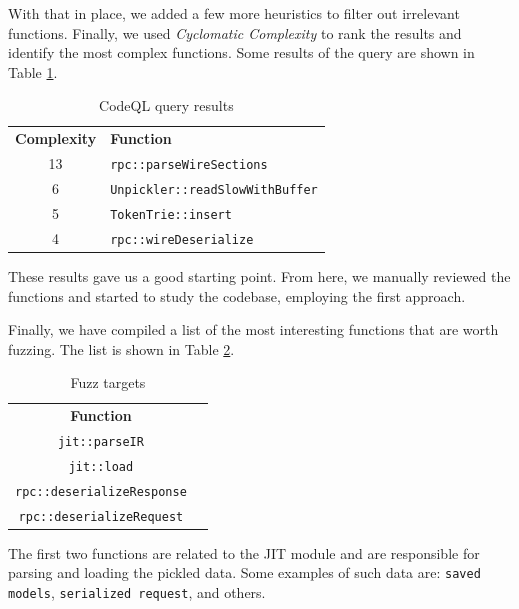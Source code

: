 With that in place, we added a few more heuristics to filter out irrelevant functions. Finally, we used \textit{Cyclomatic Complexity} \cite{cyclomatic-complexity-density} to rank the results and identify the most complex functions. Some results of the query are shown in Table \ref{table:codeql-results}.

\begin{table}[h]
    \centering
    \begin{tabular}{cl}
        \toprule
        \textbf{Complexity} & \textbf{Function}                      \\
        13                  & \texttt{rpc::parseWireSections}        \\
        6                   & \texttt{Unpickler::readSlowWithBuffer} \\
        5                   & \texttt{TokenTrie::insert}             \\
        4                   & \texttt{rpc::wireDeserialize}          \\
        \bottomrule
    \end{tabular}
    \caption{CodeQL query results}
    \label{table:codeql-results}
\end{table}

These results gave us a good starting point. From here, we manually reviewed the functions and started to study the codebase, employing the first approach.

Finally, we have compiled a list of the most interesting functions that are worth fuzzing. The list is shown in Table \ref{table:fuzz-targets}.

\begin{table}[h]
    \centering
    \begin{tabular}{cl}
        \toprule
        \textbf{Function}                 \\
        \texttt{jit::parseIR}             \\
        \texttt{jit::load}                \\
        \texttt{rpc::deserializeResponse} \\
        \texttt{rpc::deserializeRequest}  \\
        \bottomrule
    \end{tabular}
    \caption{Fuzz targets}
    \label{table:fuzz-targets}
\end{table}

The first two functions are related to the JIT module and are responsible for parsing and loading the pickled data. Some examples of such data are: \texttt{saved models}, \texttt{serialized request}, and others.

